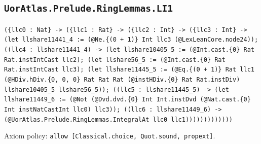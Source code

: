 \documentclass[11pt]{article}
\begin{document}
\subsection*{\texttt{UorAtlas.Prelude.RingLemmas.LI1}}
\noindent\texttt{(\{llc0 : Nat\} -> (\{llc1 : Rat\} -> (\{llc2 : Int\} -> (\{llc3 : Int\} -> (let llshare11441\_4 := (@Ne.\{(0 + 1)\} Int llc3 (@LexLeanCore.node24)); ((llc4 : llshare11441\_4) -> (let llshare10405\_5 := (@Int.cast.\{0\} Rat Rat.instIntCast llc2); (let llshare56\_5 := (@Int.cast.\{0\} Rat Rat.instIntCast llc3); (let llshare11445\_5 := (@Eq.\{(0 + 1)\} Rat llc1 (@HDiv.hDiv.\{0, 0, 0\} Rat Rat Rat (@instHDiv.\{0\} Rat Rat.instDiv) llshare10405\_5 llshare56\_5)); ((llc5 : llshare11445\_5) -> (let llshare11449\_6 := (@Not (@Dvd.dvd.\{0\} Int Int.instDvd (@Nat.cast.\{0\} Int instNatCastInt llc0) llc3)); ((llc6 : llshare11449\_6) -> (@UorAtlas.Prelude.RingLemmas.IntegralAt llc0 llc1)))))))))))))}\par
\noindent Axiom policy: \texttt{allow [Classical.choice, Quot.sound, propext]}.\par
\end{document}
